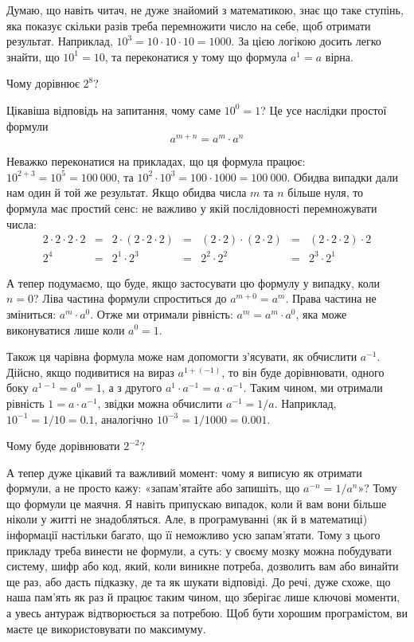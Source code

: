 Думаю, що навіть читач, не дуже знайомий з математикою, знає що таке ступінь, яка показує скільки разів треба перемножити число на себе, щоб отримати результат.
Наприклад, $10^3=10 \cdot 10 \cdot 10 = 1000$.
За цією логікою досить легко знайти, що $10^1 = 10$, та переконатися у тому що формула $a^1=a$ вірна.

\begin{exercise}
Чому дорівнює $2^8$?
\end{exercise}

Цікавіша відповідь на запитання, чому саме $10^0=1$?
Це усе наслідки простої формули
\begin{equation} a^{m+n} = a^m \cdot a^n \label{FormulaPowerAddition} \end{equation}

Неважко переконатися на прикладах, що ця формула працює: $10^{2+3} = 10^5 = 100~000$, та $10^2 \cdot 10^3 = 100 \cdot 1000 = 100~000$.
Обидва випадки дали нам один й той же результат.
Якщо обидва числа $m$ та $n$ більше нуля, то формула має простий сенс: не важливо у якій послідовності перемножувати числа:
$$ \begin{array}{ccccccc}
2\cdot2\cdot2\cdot2 &=& 2\cdot(2\cdot2\cdot2) &=& (2\cdot2)\cdot(2\cdot2) &=& (2\cdot2\cdot2)\cdot2 \\
2^4 &=& 2^1 \cdot 2^3 &=& 2^2 \cdot 2^2 &=& 2^3 \cdot 2^1
\end{array} $$

А тепер подумаємо, що буде, якщо застосувати цю формулу у випадку, коли $n=0$?
Ліва частина формули спроститься до $a^{m+0} = a^m$.
Права частина не зміниться: $a^m \cdot a^0$.
Отже ми отримали рівність: $a^m = a^m \cdot a^0$, яка може виконуватися лише коли $a^0=1$.

Також ця чарівна формула може нам допомогти з'ясувати, як обчислити $a^{-1}$.
Дійсно, якщо подивитися на вираз $a^{1+(-1)}$, то він буде дорівнювати, одного боку $a^{1-1}=a^0=1$, а з другого $a^1 \cdot a^{-1} = a \cdot a^{-1}$.
Таким чином, ми отримали рівність $1 = a \cdot a^{-1}$, звідки можна обчислити $a^{-1} = 1/a$.
Наприклад, $10^{-1} = 1/10 = 0.1$, аналогічно $10^{-3} = 1/1000 = 0.001$.

\begin{exercise}
Чому буде дорівнювати $2^{-2}$?
\end{exercise}

А тепер дуже цікавий та важливий момент: чому я виписую як отримати формули, а не просто кажу: «запам'ятайте або запишіть, що $a^{-n}=1/a^n$»?
Тому що формули це маячня.
Я навіть припускаю випадок, коли й вам вони більше ніколи у житті не знадобляться.
Але, в програмуванні (як й в математиці) інформації настільки багато, що її неможливо усю запам'ятати.
Тому з цього прикладу треба винести не формули, а суть: у своєму мозку можна побудувати систему, шифр або код, який, коли виникне потреба, дозволить вам або винайти ще раз, або дасть підказку, де та як шукати відповіді.
До речі, дуже схоже, що наша пам'ять як раз й працює таким чином, що зберігає лише ключові моменти, а увесь антураж відтворюється за потребою.
Щоб бути хорошим програмістом, ви маєте це використовувати по максимуму.

